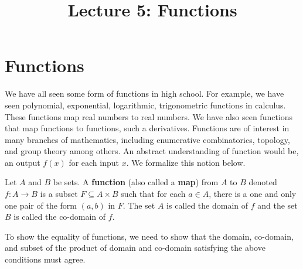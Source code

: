 \documentclass[a4paper,english,12pt]{article}
\begin{document}
\title{Lecture 5: Functions}
\author{}
\maketitle

\section{Functions}
We have all seen some form of functions in high school. For example, we have seen polynomial, exponential, logarithmic, trigonometric functions in calculus. These functions map real numbers to real numbers. We have also seen functions that map functions to functions, such a derivatives. Functions are of interest in many branches of mathematics, including enumerative combinatorics, topology, and group theory among others. An abstract understanding of function would be, an output $f(x)$ for each input $x$. We formalize this notion below.
\begin{defn} [Function]
 Let $A$ and $B$ be sets. A \textbf{function} (also called a \textbf{map}) from $A$ to $B$ denoted $f: A \to B$ is a subset $F \subseteq A \times B$ such that for each $a \in A$, there is a one and only one pair of the form $(a,b)$ in $F$. The set $A$ is called the domain of $f$ and the set $B$ is called the co-domain of $f$.
\end{defn}

\begin{rem} To show the equality of functions, we need to show that the domain, co-domain, and subset of the product of domain and co-domain satisfying the above conditions must agree.
\end{rem}
\end{document}
